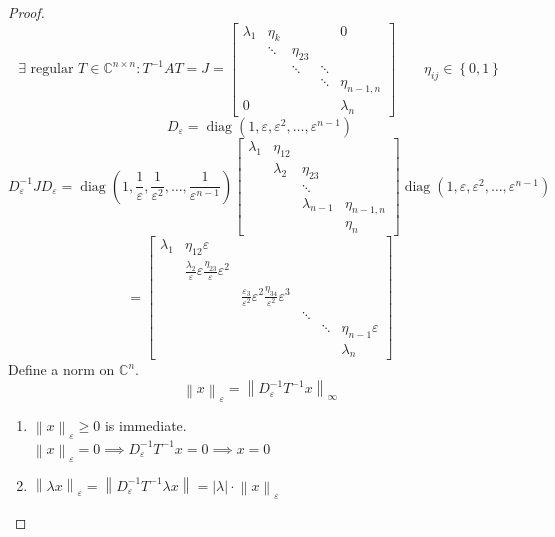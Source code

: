 \documentclass{article}
\newcommand{\set}[1]{\left\{#1\right\}}
\newcommand{\norm}[1]{\left\|#1\right\|}
\newcommand{\card}[1]{\left|#1\right|}
\begin{document}
\begin{proof}
  \[ \exists \text{ regular } T \in \mathbb C^{n \times n}: T^{-1} AT = J = \begin{bmatrix} \lambda_1 & \eta_k & & & 0 \\ & \ddots & \eta_{23} & & \\ & & \ddots & \ddots & \\ & & & \ddots & \eta_{n-1,n} \\ 0 & & & & \lambda_n \end{bmatrix} \qquad \eta_{ij} \in \set{0,1} \]
  \[ D_{\varepsilon} = \operatorname{diag}(1, \varepsilon, \varepsilon^2, \dots, \varepsilon^{n-1}) \]
  \[
    D_{\varepsilon}^{-1} J D_{\varepsilon}
      = \operatorname{diag}(1, \frac1\varepsilon, \frac1{\varepsilon^2}, \dots, \frac{1}{\varepsilon^{n-1}})
      \begin{bmatrix} \lambda_1 & \eta_{12} & & \\ & \lambda_2 & \eta_{23} & \\ & & \ddots & \\ & & \lambda_{n-1} & \eta_{n-1,n} \\ & & & \eta_{n} \end{bmatrix}
      \operatorname{diag}(1, \varepsilon, \varepsilon^2, \dots, \varepsilon^{n-1})
  \] \[
      = \begin{bmatrix}
        \lambda_1 & \eta_{12} \varepsilon & & & & \\
          & \frac{\lambda_2}{\varepsilon} \varepsilon \frac{\eta_{23}}{\varepsilon} \varepsilon^2  & & & & \\
          & & \frac{\varepsilon_{3}}{\varepsilon^2} \varepsilon^2 \frac{\eta_{34}}{\varepsilon^2} \varepsilon^3 & & & \\
          & & & \ddots & & \\
          & & & & \ddots & \eta_{n-1} \varepsilon \\
          & & & & & \lambda_n
      \end{bmatrix}
  \]
  Define a norm on $\mathbb C^n$.
  \[ \norm{x}_{\varepsilon} = \norm{D_{\varepsilon}^{-1} T^{-1} x}_{\infty} \]
  \begin{enumerate}
    \item $\norm{x}_{\varepsilon} \geq 0$ is immediate. \\
      $\norm{x}_{\varepsilon} = 0 \implies D_{\varepsilon}^{-1} T^{-1} x = 0 \implies x = 0$
    \item $\norm{\lambda x}_{\varepsilon} = \norm{D_{\varepsilon}^{-1} T^{-1} \lambda x} = \card{\lambda} \cdot \norm{x}_{\varepsilon}$

\end{enumerate}
\end{proof}
\end{document}
